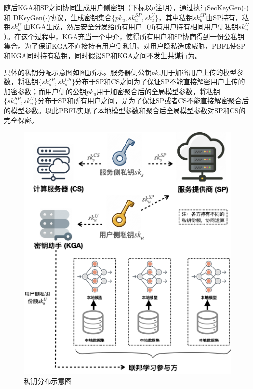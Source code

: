 随后KGA和SP之间协同生成用户侧密钥（下标以$ u $注明），通过执行SecKeyGen($\cdot$) 和 DKeyGen($\cdot$)协议，生成密钥集合$\{pk_u, sk_{u}^{SP}, sk_{u}^{U}\}$，其中私钥$ sk_{u}^{SP} $由SP持有，私钥$ sk_{u}^{U} $ 由KGA生成，然后安全分发给所有用户（所有用户持有相同用户侧私钥$sk_{u}^{U}$）。在这个过程中，KGA充当一个中介，使得所有用户和SP协商得到一份公私钥集合。为了保证KGA不直接持有用户侧私钥，对用户隐私造成威胁，PBFL使SP和KGA同时持有私钥，同时假设SP和KGA之间不发生共谋行为。

具体的私钥分配示意图如图\ref{keypng}所示。服务器侧公钥$pk_s$用于加密用户上传的模型参数，将私钥$\{sk_{s}^{SP}, sk_{s}^{CS}\}$分布于SP和CS之间为了保证SP不能直接解密用户上传的加密参数；而用户侧的公钥$pk_u$用于加密聚合后的全局模型参数，将私钥$\{sk_{u}^{SP}, sk_{u}^{U}\}$分布于SP和所有用户之间，是为了保证SP或者CS不能直接解密聚合后的模型参数。以此PBFL实现了本地模型参数和聚合后全局模型参数对SP和CS的完全保密。

\begin{figure}[htbp]
	\begin{center}
		\includegraphics[width=0.5\linewidth]{figures/keynote-figs/Key-分配.png}
		\caption{私钥分布示意图}
		\label{keypng}
	\end{center}
\end{figure}

